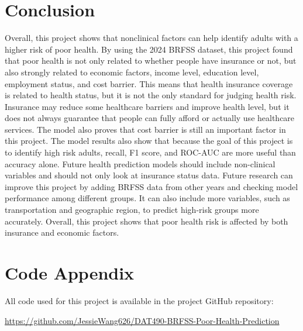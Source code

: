 \section{Conclusion}
Overall, this project shows that nonclinical factors can help identify adults with a higher risk of poor health. By using the 2024 BRFSS dataset, this project found that poor health is not only related to whether people have insurance or not, but also strongly related to economic factors, income level, education level, employment status, and cost barrier. This means that health insurance coverage is related to health status, but it is not the only standard for judging health risk. Insurance may reduce some healthcare barriers and improve health level, but it does not always guarantee that people can fully afford or actually use healthcare services. The model also proves that cost barrier is still an important factor in this project.
The model results also show that because the goal of this project is to identify high risk adults, recall, F1 score, and ROC-AUC are more useful than accuracy alone. Future health prediction models should include non-clinical variables and should not only look at insurance status data.
Future research can improve this project by adding BRFSS data from other years and checking model performance among different groups. It can also include more variables, such as transportation and geographic region, to predict high-risk groups more accurately. Overall, this project shows that poor health risk is affected by both insurance and economic factors.
\section{Code Appendix}

All code used for this project is available in the project GitHub repository:

\begin{center}
\url{https://github.com/JessieWang626/DAT490-BRFSS-Poor-Health-Prediction}
\end{center}


\appendix

